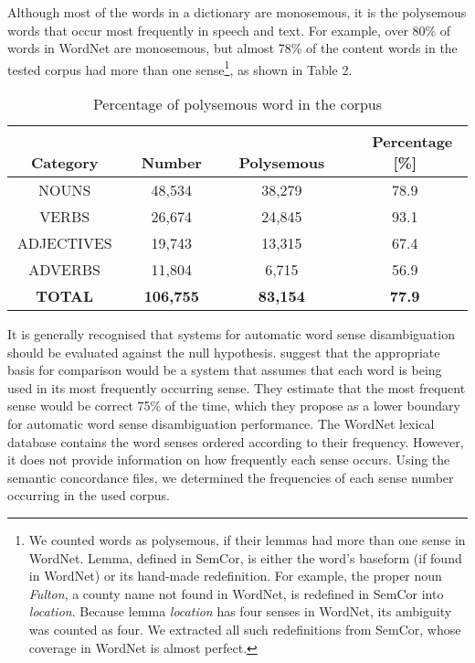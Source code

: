 Although most of the words in a dictionary are monosemous, it is the polysemous words that occur most frequently in speech and text. For example, over 80\% of words in WordNet are monosemous, but almost 78\% of the content words in the tested corpus had more than one sense\footnote{We counted words as polysemous, if their lemmas had more than one sense in WordNet. Lemma, defined in SemCor, is either the word's baseform (if found in WordNet) or its hand-made redefinition. For example, the proper noun {\it Fulton}, a county name not found in WordNet, is redefined in SemCor into {\it location}. Because lemma {\it location} has four senses in WordNet, its ambiguity was counted as four. We extracted all such redefinitions from SemCor, whose coverage in WordNet is almost perfect.}, as shown in Table 2. 

\begin{table}[t]
  \leavevmode
    \caption{Percentage of polysemous word in the corpus}
    \label{tab:2}
  \begin{center}
\begin{tabular}[c]{|c|c|c|c|}\hline
\multicolumn{1}{|p{3cm}|}{\bf 　　 Category} & 
\multicolumn{1}{|p{3cm}|}{\bf 　　 Number} & 
\multicolumn{1}{|p{3cm}|}{\bf 　　Polysemous} & 
\multicolumn{1}{|p{3cm}|}{\bf 　Percentage [\%]} \\\hline
 NOUNS & 48,534 & 38,279 & 78.9 \\\hline
 VERBS & 26,674 & 24,845 & 93.1 \\\hline
 ADJECTIVES & 19,743 & 13,315 & 67.4 \\\hline
 ADVERBS & 11,804 & 6,715 & 56.9 \\\hline
{\bf TOTAL} & {\bf 106,755} & {\bf 83,154} & {\bf 77.9}\\\hline
\end{tabular}
\end{center}
\end{table}


It is generally recognised that systems for automatic word sense disambiguation should be evaluated against the null hypothesis. \cite{Gale92} suggest that the appropriate basis for comparison would be a system that assumes that each word is being used in its most frequently occurring sense. They estimate that the most frequent sense would be correct 75\% of the time, which they propose as a lower boundary for automatic word sense disambiguation performance. The WordNet lexical database contains the word senses ordered according to their frequency. However, it does not provide information on how frequently each sense occurs. Using the semantic concordance files, we determined the frequencies of each sense number occurring in the used corpus. 

